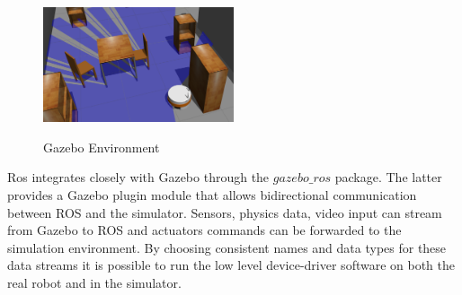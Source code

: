 \begin{figure}[H]
\centering
\includegraphics[width=0.5\textwidth]{imgs/gazebo2.png}
\label{fig:gazebo2}
\caption{Gazebo Environment}
\end{figure}

Ros integrates closely with Gazebo through the $gazebo\_ros$ package. The latter provides a Gazebo plugin module that allows bidirectional communication between ROS and the simulator. Sensors, physics data, video input can stream from Gazebo to ROS and actuators commands can be forwarded to the simulation environment. By choosing consistent names and data types for these data streams it is possible to run the low level device-driver software on both the real robot and in the simulator.